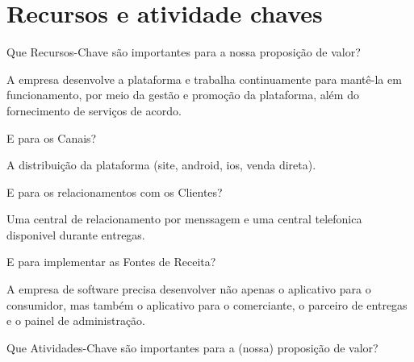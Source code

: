 \section{\textbf{Recursos e atividade chaves}}
\label{sec: Recursos e atividade chaves}

\begin{commentA} \vspace{0.3cm} \noindent Que Recursos-Chave são importantes para a nossa proposição de valor? \par \vspace{0.1cm} \end{commentA}


A empresa desenvolve a plataforma e trabalha continuamente para mantê-la em funcionamento, por meio da gestão e promoção da plataforma, além do fornecimento de serviços de acordo.\par

\begin{commentA} \vspace{0.3cm} \noindent E para os Canais? \par \vspace{0.1cm} \end{commentA}


A distribuição da plataforma (site, android, ios, venda direta).

\begin{commentA} \vspace{0.3cm} \noindent E para os relacionamentos com os Clientes? \par \vspace{0.1cm} \end{commentA}


Uma central de relacionamento por menssagem e uma central telefonica disponivel durante entregas.

\begin{commentA} \vspace{0.3cm} \noindent E para implementar as Fontes de Receita? \par \vspace{0.1cm} \end{commentA}


A empresa de software precisa desenvolver não apenas o aplicativo para o consumidor, mas também o aplicativo para o comerciante, o parceiro de entregas e o painel de administração.

\begin{commentA} \vspace{0.3cm} \noindent Que Atividades-Chave são importantes para a (nossa) proposição de valor? \par \vspace{0.1cm} \end{commentA}


